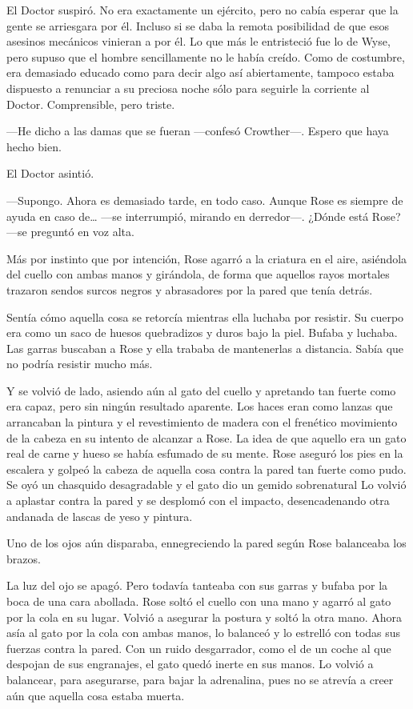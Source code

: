 {El Doctor suspiró. No era exactamente un ejército, pero no cabía
	esperar que la gente se arriesgara por él. Incluso si se daba la remota
	posibilidad de que esos asesinos mecánicos vinieran a por él. Lo que más
	le entristeció fue lo de Wyse, pero supuso que el hombre sencillamente
	no le había creído. Como de costumbre, era demasiado educado como para
	decir algo así abiertamente, tampoco estaba dispuesto a renunciar a su
	preciosa noche sólo para seguirle la corriente al Doctor. Comprensible,
pero triste.}

{---He dicho a las damas que se fueran ---confesó Crowther---. Espero
que haya hecho bien.}

{El Doctor asintió.}

{---Supongo. Ahora es demasiado tarde, en todo caso. Aunque Rose es
	siempre de ayuda en caso de\ldots{} ---se interrumpió, mirando en
derredor---. ¿Dónde está Rose? ---se preguntó en voz alta.}

\mbox{}

{Más por instinto que por intención, Rose agarró a la criatura en el
	aire, asiéndola del cuello con ambas manos y girándola, de forma que
	aquellos rayos mortales trazaron sendos surcos negros y abrasadores por
la pared que tenía detrás.}

{Sentía cómo aquella cosa se retorcía mientras ella luchaba por
	resistir. Su cuerpo era como un saco de huesos quebradizos y duros bajo
	la piel. Bufaba y luchaba. Las garras buscaban a Rose y ella trababa de
mantenerlas a distancia. Sabía que no podría resistir mucho más.}

{Y se volvió de lado, asiendo aún al gato del cuello y apretando tan
	fuerte como era capaz, pero sin ningún resultado aparente. Los haces
	eran como lanzas que arrancaban la pintura y el revestimiento de madera
	con el frenético movimiento de la cabeza en su intento de alcanzar a
	Rose. La idea de que aquello era un gato real de carne y hueso se había
	esfumado de su mente. Rose aseguró los pies en la escalera y golpeó la
	cabeza de aquella cosa contra la pared tan fuerte como pudo. Se oyó un
	chasquido desagradable y el gato dio un gemido sobrenatural Lo volvió a
	aplastar contra la pared y se desplomó con el impacto, desencadenando
otra andanada de lascas de yeso y pintura.}

{Uno de los ojos aún disparaba, ennegreciendo la pared según Rose
balanceaba los brazos.}

{La luz del ojo se apagó. Pero todavía tanteaba con sus garras y bufaba
	por la boca de una cara abollada. Rose soltó el cuello con una mano y
	agarró al gato por la cola en su lugar. Volvió a asegurar la postura y
	soltó la otra mano. Ahora asía al gato por la cola con ambas manos, lo
	balanceó y lo estrelló con todas sus fuerzas contra la pared. Con un
	ruido desgarrador, como el de un coche al que despojan de sus
	engranajes, el gato quedó inerte en sus manos. Lo volvió a balancear,
	para asegurarse, para bajar la adrenalina, pues no se atrevía a creer
aún que aquella cosa estaba muerta.}

